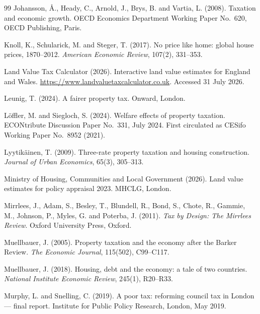 \begin{thebibliography}{99}
Johansson, {\AA}., Heady, C., Arnold, J., Brys, B. and Vartia, L. (2008).
\newblock Taxation and economic growth.
\newblock OECD Economics Department Working Paper No.~620, OECD Publishing, Paris.

Knoll, K., Schularick, M. and Steger, T. (2017).
\newblock No price like home: global house prices, 1870--2012.
\newblock \emph{American Economic Review}, 107(2), 331--353.

Land Value Tax Calculator (2026).
\newblock Interactive land value estimates for England and Wales.
\newblock \url{https://www.landvaluetaxcalculator.co.uk}. Accessed 31 July 2026.

Leunig, T. (2024).
\newblock A fairer property tax.
\newblock Onward, London.

L\"offler, M. and Siegloch, S. (2024).
\newblock Welfare effects of property taxation.
\newblock ECONtribute Discussion Paper No.~331, July 2024. First circulated as CESifo Working Paper No.~8952 (2021).

Lyytik\"ainen, T. (2009).
\newblock Three-rate property taxation and housing construction.
\newblock \emph{Journal of Urban Economics}, 65(3), 305--313.

Ministry of Housing, Communities and Local Government (2026).
\newblock Land value estimates for policy appraisal 2023.
\newblock MHCLG, London.

Mirrlees, J., Adam, S., Besley, T., Blundell, R., Bond, S., Chote, R., Gammie, M., Johnson, P., Myles, G. and Poterba, J. (2011).
\newblock \emph{Tax by Design: The Mirrlees Review}.
\newblock Oxford University Press, Oxford.

Muellbauer, J. (2005).
\newblock Property taxation and the economy after the Barker Review.
\newblock \emph{The Economic Journal}, 115(502), C99--C117.

Muellbauer, J. (2018).
\newblock Housing, debt and the economy: a tale of two countries.
\newblock \emph{National Institute Economic Review}, 245(1), R20--R33.

Murphy, L. and Snelling, C. (2019).
\newblock A poor tax: reforming council tax in London --- final report.
\newblock Institute for Public Policy Research, London, May 2019.


\end{thebibliography}
